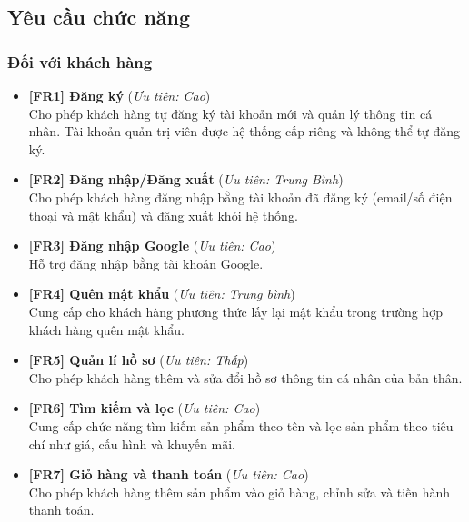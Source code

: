 \subsection{Yêu cầu chức năng}

 \subsubsection{Đối với khách hàng}

\begin{itemize}

\item \textbf{[FR1] Đăng ký} \quad (\textit{Ưu tiên: Cao})\\
    Cho phép khách hàng tự đăng ký tài khoản mới và quản lý thông tin cá nhân. Tài khoản quản trị viên được hệ thống cấp riêng và không thể tự đăng ký.

\item \textbf{[FR2] Đăng nhập/Đăng xuất} \quad (\textit{Ưu tiên: Trung Bình})\\
    Cho phép khách hàng đăng nhập bằng tài khoản đã đăng ký (email/số điện thoại và mật khẩu) và đăng xuất khỏi hệ thống.

\item \textbf{[FR3] Đăng nhập Google} \quad (\textit{Ưu tiên: Cao})\\
    Hỗ trợ đăng nhập bằng tài khoản Google.

\item \textbf{[FR4] Quên mật khẩu} \quad (\textit{Ưu tiên: Trung bình})\\
    Cung cấp cho khách hàng phương thức lấy lại mật khẩu trong trường hợp khách hàng quên mật khẩu.

\item \textbf{[FR5] Quản lí hồ sơ} \quad (\textit{Ưu tiên: Thấp})\\
    Cho phép khách hàng thêm và sửa đổi hồ sơ thông tin cá nhân của bản thân.

\item \textbf{[FR6] Tìm kiếm và lọc} \quad (\textit{Ưu tiên: Cao})\\
    Cung cấp chức năng tìm kiếm sản phẩm theo tên và lọc sản phẩm theo tiêu chí như giá, cấu hình và khuyến mãi.

\item \textbf{[FR7] Giỏ hàng và thanh toán} \quad (\textit{Ưu tiên: Cao})\\
    Cho phép khách hàng thêm sản phẩm vào giỏ hàng, chỉnh sửa và tiến hành thanh toán.


\end{itemize}
